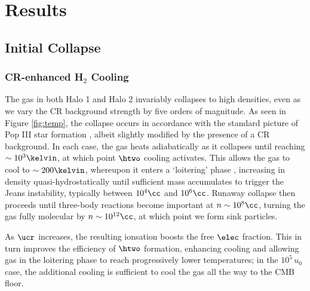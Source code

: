 \section{Results}
\label{sec:results}
\subsection{Initial Collapse}
\subsubsection{CR-enhanced H$_2$ Cooling}
\label{sec:initial_collapse}

The gas in both Halo 1 and Halo 2 invariably collapses to high densities, even as we vary the CR background strength by five orders of magnitude. As seen in Figure \ref{fig:temp}, the collapse occurs in accordance with the standard picture of Pop III star formation \citep[e.g.,][]{Greifetal2012, StacyBromm2013, Hiranoetal2014, Hosokawaetal2015}, albeit slightly modified by the presence of a CR background.  In each case, the gas heats adiabatically as it collapses until reaching $\sim10^3\kelvin$, at which point $\htwo$ cooling activates.  This allows the gas to cool to $\sim200\kelvin$, whereupon it enters a `loitering' phase \citep{BrommCoppiLarson2002}, increasing in density quasi-hydrostatically until sufficient mass accumulates to trigger the Jeans instability, typically between $10^4\cc$ and $10^6\cc$. Runaway collapse then proceeds until three-body reactions become important at $n\sim10^8\cc$, turning the gas fully molecular by $n\sim10^{12}\cc$, at which point we form sink particles.

As $\ucr$ increases, the resulting ionsation boosts the free $\elec$ fraction.  This in turn improves the efficiency of $\htwo$ formation, enhancing cooling and allowing gas in the loitering phase to reach progressively lower temperatures; in the $10^5\,u_0$ case, the additional cooling is sufficient to cool the gas all the way to the CMB floor.


